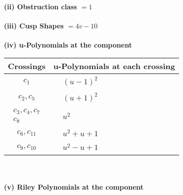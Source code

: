 \documentclass[1p]{elsarticle_modified}
\theoremstyle{definition}
\begin{document}
\flushleft \textbf{(ii) Obstruction class $= 1$}\\~\\
\flushleft \textbf{(iii) Cusp Shapes $= 4 v-10$}\\~\\
\newpage\renewcommand{\arraystretch}{1}
\flushleft \textbf{(iv) u-Polynomials at the component}\newline \\
\begin{tabular}{m{50pt}|m{274pt}}
Crossings & \hspace{64pt}u-Polynomials at each crossing \\
\hline $$\begin{aligned}c_{1}\end{aligned}$$&$\begin{aligned}
&(u-1)^2
\end{aligned}$\\
\hline $$\begin{aligned}c_{2},c_{5}\end{aligned}$$&$\begin{aligned}
&(u+1)^2
\end{aligned}$\\
\hline $$\begin{aligned}c_{3},c_{4},c_{7}\\c_{8}\end{aligned}$$&$\begin{aligned}
&u^2
\end{aligned}$\\
\hline $$\begin{aligned}c_{6},c_{11}\end{aligned}$$&$\begin{aligned}
&u^2+u+1
\end{aligned}$\\
\hline $$\begin{aligned}c_{9},c_{10}\end{aligned}$$&$\begin{aligned}
&u^2- u+1
\end{aligned}$\\
\hline
\end{tabular}\\~\\
\newpage\renewcommand{\arraystretch}{1}
\flushleft \textbf{(v) Riley Polynomials at the component}\newline \\
\end{document}
